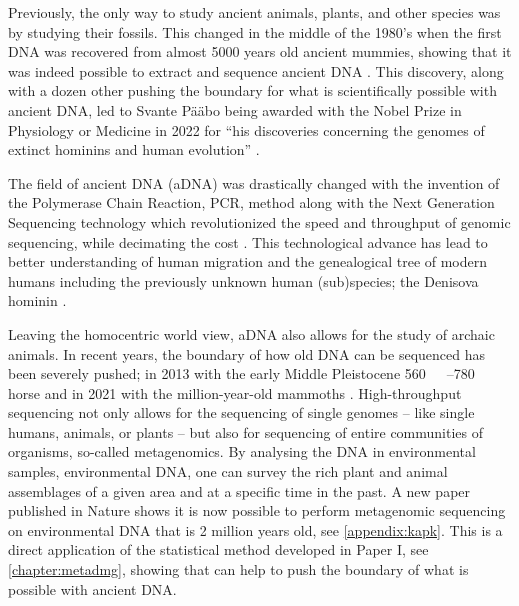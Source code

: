 
Previously, the only way to study ancient animals, plants, and other species was by studying their fossils. This changed in the middle of the 1980's when the first DNA was recovered from almost 5000 years old ancient mummies, showing that it was indeed possible to extract and sequence ancient DNA \autocite{paaboMolecularCloningAncient1985,paaboPreservationDNAAncient1985}. This discovery, along with a dozen other pushing the boundary for what is scientifically possible with ancient DNA, led to Svante Pääbo being awarded with the Nobel Prize in Physiology or Medicine in 2022 for ``his discoveries concerning the genomes of extinct hominins and human evolution'' \autocite{thenobelassemblyatkarolinskainstitutetNobelPrizePhysiology2022}.

The field of ancient DNA (aDNA) was drastically changed with the invention of the Polymerase Chain Reaction, PCR, method \autocite{mullisSpecificEnzymaticAmplification1986} along with the Next Generation Sequencing technology which revolutionized the speed and throughput of genomic sequencing, while decimating the cost \autocite{slatkoOverviewNextGeneration2018}. This technological advance has lead to better understanding of human migration and the genealogical tree of modern humans including the previously unknown human (sub)species; the Denisova hominin \autocite{krauseCompleteMitochondrialDNA2010}.

Leaving the homocentric world view, aDNA also allows for the study of archaic animals. In recent years, the boundary of how old DNA can be sequenced has been severely pushed; in 2013 with the early Middle Pleistocene \qtyrange[range-phrase = --,range-units = single]{560}{780}{\kilo\year\BP} horse \autocite{orlandoRecalibratingEquusEvolution2013} and in 2021 with the million-year-old mammoths \autocite{vandervalkMillionyearoldDNASheds2021}. High-throughput sequencing not only allows for the sequencing of single genomes -- like single humans, animals, or plants -- but also for sequencing of entire communities of organisms, so-called metagenomics. By analysing the DNA in environmental samples, environmental DNA, one can survey the rich plant and animal assemblages of a given area and at a specific time in the past. A new paper published in Nature shows it is now possible to perform metagenomic sequencing on environmental DNA that is 2 million years old, see \autoref{appendix:kapk}. This is a direct application of the statistical method developed in Paper I, see \autoref{chapter:metadmg}, showing that \metaDMG can help to push the boundary of what is possible with ancient DNA.

